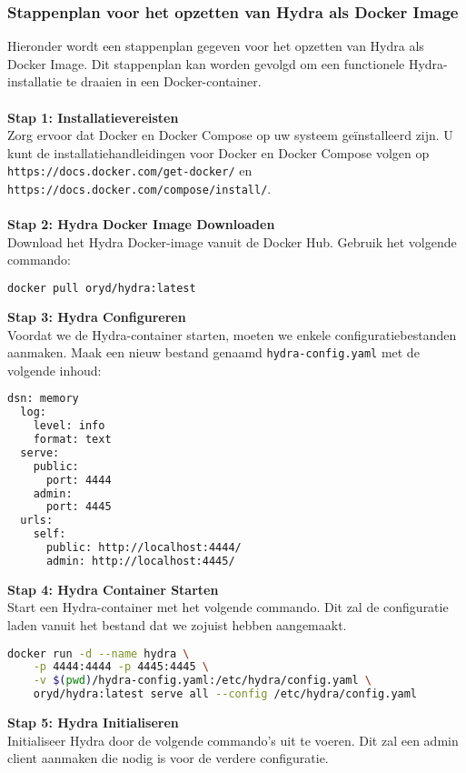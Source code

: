 \subsubsection{Stappenplan voor het opzetten van Hydra als Docker Image}%
\label{subsubsec:hydra-setup}
Hieronder wordt een stappenplan gegeven voor het opzetten van Hydra als Docker Image. Dit stappenplan kan worden gevolgd om een functionele Hydra-installatie te draaien in een Docker-container.\\\\
\textbf{Stap 1: Installatievereisten}\\
Zorg ervoor dat Docker en Docker Compose op uw systeem geïnstalleerd zijn. U kunt de installatiehandleidingen voor Docker en Docker Compose volgen op\\ \texttt{https://docs.docker.com/get-docker/} en \texttt{https://docs.docker.com/compose/install/}.\\\\
\textbf{Stap 2: Hydra Docker Image Downloaden}\\
Download het Hydra Docker-image vanuit de Docker Hub. Gebruik het volgende commando:
\begin{lstlisting}[language=bash]
  docker pull oryd/hydra:latest
\end{lstlisting}
\textbf{Stap 3: Hydra Configureren}\\
Voordat we de Hydra-container starten, moeten we enkele configuratiebestanden aanmaken. Maak een nieuw bestand genaamd \texttt{hydra-config.yaml} met de volgende inhoud:
\begin{lstlisting}[language=bash]
  dsn: memory
  log:
    level: info
    format: text
  serve:
    public:
      port: 4444
    admin:
      port: 4445
  urls:
    self:
      public: http://localhost:4444/
      admin: http://localhost:4445/
\end{lstlisting}
\textbf{Stap 4: Hydra Container Starten}\\
Start een Hydra-container met het volgende commando. Dit zal de configuratie laden vanuit het bestand dat we zojuist hebben aangemaakt.
\begin{lstlisting}[language=bash]
docker run -d --name hydra \
    -p 4444:4444 -p 4445:4445 \
    -v $(pwd)/hydra-config.yaml:/etc/hydra/config.yaml \
    oryd/hydra:latest serve all --config /etc/hydra/config.yaml
\end{lstlisting}
\textbf{Stap 5: Hydra Initialiseren}\\
Initialiseer Hydra door de volgende commando's uit te voeren. Dit zal een admin client aanmaken die nodig is voor de verdere configuratie.

